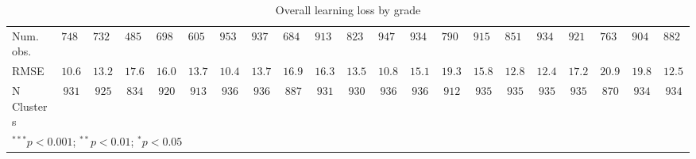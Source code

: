 \begin{table}
\begin{center}
\begin{tabular}{l c c c c c c c c c c c c c c c c c c c c}
Num. obs.                 & $74829$       & $73263$       & $48537$       & $69841$       & $60521$      & $95364$       & $93769$       & $68412$       & $91315$       & $82377$       & $94747$       & $93417$       & $79016$       & $91567$       & $85189$       & $93439$       & $92180$       & $76397$       & $90403$       & $88251$       \\
RMSE                      & $10.66$       & $13.24$       & $17.63$       & $16.07$       & $13.79$      & $10.40$       & $13.78$       & $16.90$       & $16.39$       & $13.50$       & $10.83$       & $15.16$       & $19.35$       & $15.88$       & $12.80$       & $12.44$       & $17.23$       & $20.91$       & $19.85$       & $12.54$       \\
N Clusters                & $931$         & $925$         & $834$         & $920$         & $913$        & $936$         & $936$         & $887$         & $931$         & $930$         & $936$         & $936$         & $912$         & $935$         & $935$         & $935$         & $935$         & $870$         & $934$         & $934$         \\
\hline
\multicolumn{21}{l}{\scriptsize{$^{***}p<0.001$; $^{**}p<0.01$; $^{*}p<0.05$}}
\end{tabular}
\caption{Overall learning loss by grade}
\label{table:grade}
\end{center}
\end{table}
